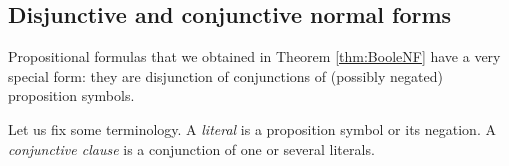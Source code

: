 

\setcounter{section}{1}
\setcounter{subsection}{5}
\setcounter{dfn}{15}

\subsection{Disjunctive and conjunctive normal forms}
Propositional formulas that we obtained in Theorem \ref{thm:BooleNF} have a very special form:
they are disjunction of conjunctions of (possibly negated) proposition symbols.

Let us fix some terminology.
A \emph{literal} is a proposition symbol or its negation.
A \emph{conjunctive clause} is a conjunction of one or several literals.


